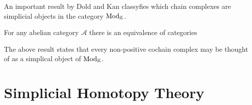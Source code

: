 \documentclass[../thesis.tex]{subfiles}
\begin{document}
        An important result by Dold and Kan classyfies which chain complexes are simplicial objects in the category $\tt{Mod}_\mathbb{K}$.

        \begin{thm}
            For any abelian category $\mathcal{A}$ there is an equivalence of categories
            \begin{center}
            \end{center}
        \end{thm}

        \begin{example}
            The above result states that every non-positive cochain complex may be thought of as a simplical object of $\tt{Mod}_\mathbb{K}$. 
        \end{example}

    \section{Simplicial Homotopy Theory}
\end{document}
